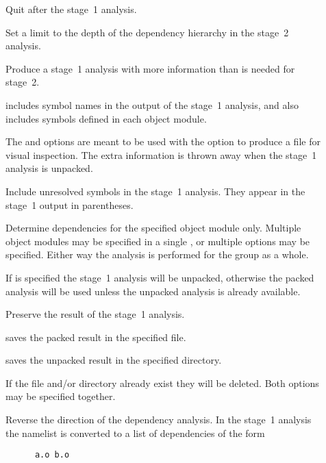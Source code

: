 \begin{description}
\item[]
   Quit after the stage~1 analysis.

\item[]
   Set a limit to the depth of the dependency hierarchy in the stage~2
   analysis.

\item[]
   Produce a stage~1 analysis with more information than is needed for
   stage~2.

    includes symbol names in the output of the stage~1 analysis, and
    also includes symbols defined in each object module.

   The  and  options are meant to be used with the 
   option to produce a file for visual inspection.  The extra information is
   thrown away when the stage~1 analysis is unpacked.

\item[]
   Include unresolved symbols in the stage~1 analysis.  They appear in the
   stage~1 output in parentheses.

\item[]
   Determine dependencies for the specified object module only.  Multiple
   object modules may be specified in a single , or multiple 
   options may be specified.  Either way the analysis is performed for the
   group as a whole.

   If  is specified the stage~1 analysis will be unpacked, otherwise
   the packed analysis will be used unless the unpacked analysis is already
   available.

\item[]
   Preserve the result of the stage~1 analysis.

    saves the packed result in the specified file.

    saves the unpacked result in the specified directory.

   If the file and/or directory already exist they will be deleted.  Both
   options may be specified together.

\item[]
   Reverse the direction of the dependency analysis.  In the stage~1 analysis
   the namelist is converted to a list of dependencies of the form

   \begin{verbatim}
      a.o b.o
   \end{verbatim}


\end{description}
